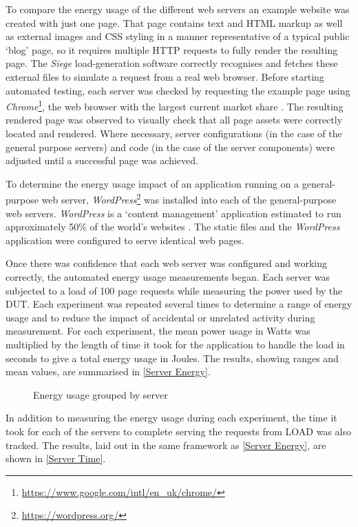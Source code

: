 To compare the energy usage of the different web servers an example website was created with just one page. That page contains text and HTML markup as well as external images and CSS styling in a manner representative of a typical public `blog' page, so it requires multiple HTTP requests to fully render the resulting page. The \emph{Siege} load-generation software correctly recognises and fetches these external files to simulate a request from a real web browser. Before starting automated testing, each server was checked by requesting the example page using \emph{Chrome}\footnote{\url{https://www.google.com/intl/en_uk/chrome/}}, the web browser with the largest current market share \citep{StatistaBrowsers}. The resulting rendered page was observed to visually check that all page assets were correctly located and rendered. Where necessary, server configurations (in the case of the general purpose servers) and code (in the case of the server components) were adjusted until a successful page was achieved.

To determine the energy usage impact of an application running on a general-purpose web server, \emph{WordPress}\footnote{\url{https://wordpress.org/}} was installed into each of the general-purpose web servers. \emph{WordPress} is a `content management' application \citep{Patel2011a} estimated to run approximately 50\% of the world's websites \citep{W3Techs2022b}. The static files and the \emph{WordPress} application were configured to serve identical web pages. 

Once there was confidence that each web server was configured and working correctly, the automated energy usage measurements began. Each server was subjected to a load of 100 page requests while measuring the power used by the DUT. Each experiment was repeated several times to determine a range of energy usage and to reduce the impact of accidental or unrelated activity during measurement. For each experiment, the mean power usage in Watts was multiplied by the length of time it took for the application to handle the load in seconds to give a total energy usage in Joules. The results, showing ranges and mean values, are summarised in \autoref{Server Energy}.

\begin{figure}[htbp]
  \centering
  
  \caption{Energy usage grouped by server}
  \label{Server Energy}
\end{figure}

In addition to measuring the energy usage during each experiment, the time it took for each of the servers to complete serving the requests from LOAD was also tracked. The results, laid out in the same framework as \autoref{Server Energy}, are shown in \autoref{Server Time}.

